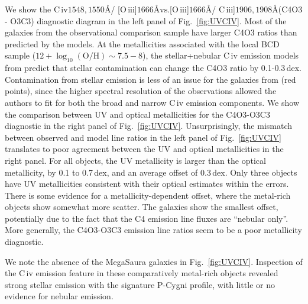 \documentclass[preprint2]{aastex62}
\newcommand{\oiii}{[O\,{\sc iii}]\xspace}
\newcommand{\civ}{C\,{\sc iv}\xspace}
\newcommand{\ciii}{C\,{\sc iii}]\xspace}
\newcommand\vs{\ensuremath{\mathrm{vs.}}\xspace}
\newcommand{\logten}{\ensuremath{\log_{10}}}
\newcommand{\logOH}{\ensuremath{\logten (\mathrm{O}/\mathrm{H})}\xspace}
\newcommand{\ang}{\ensuremath{\mbox{\AA}}\xspace}
\newcommand{\mage}{{\sc Meg}a{\sc S}a{\sc ura}\xspace}
\begin{document}
We show the \civ$1548,1550$\ang / \oiii$1666$\ang \vs \oiii$1666$\ang / \ciii$1906,1908$\ang (C4O3 - O3C3) diagnostic diagram in the left panel of Fig.~\ref{fig:UVCIV}. Most of the galaxies from the observational comparison sample have larger C4O3 ratios than predicted by the models. At the metallicities associated with the local BCD sample ($12+\logOH \sim 7.5-8$), the stellar+nebular \civ emission models from \citet{Byler+2018} predict that stellar contamination can change the C4O3 ratio by 0.1-0.3\,dex. Contamination from stellar emission is less of an issue for the galaxies from \citet{Senchyna+2017} (red points), since the higher spectral resolution of the observations allowed the authors to fit for both the broad and narrow \civ emission components.
We show the comparison between UV and optical metallicities for the C4O3-O3C3 diagnostic in the right panel of Fig.~\ref{fig:UVCIV}. Unsurprisingly, the mismatch between observed and model line ratios in the left panel of Fig.~\ref{fig:UVCIV} translates to poor agreement between the UV and optical metallicities in the right panel. For all objects, the UV metallicity is larger than the optical metallicity, by 0.1 to 0.7\,dex, and an average offset of 0.3\,dex. Only three objects have UV metallicities consistent with their optical estimates within the errors. There is some evidence for a metallicity-dependent offset, where the metal-rich objects show somewhat more scatter. The \citet{Senchyna+2017} galaxies show the smallest offset, potentially due to the fact that the C4 emission line fluxes are ``nebular only''. More generally, the C4O3-O3C3 emission line ratios seem to be a poor metallicity diagnostic.

We note the absence of the \mage galaxies in Fig.~\ref{fig:UVCIV}. Inspection of the \civ emission feature in these comparatively metal-rich objects revealed strong stellar emission with the signature P-Cygni profile, with little or no evidence for nebular emission.
\end{document}
